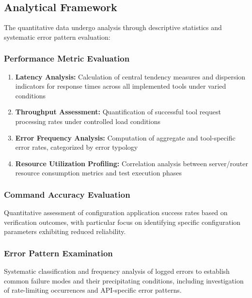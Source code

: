 \subsection{Analytical Framework}
The quantitative data undergo analysis through descriptive statistics and systematic error pattern evaluation:
\subsubsection{Performance Metric Evaluation}
\begin{enumerate}
\item \textbf{Latency Analysis:} Calculation of central tendency measures and dispersion indicators for response times across all implemented tools under varied conditions
\item \textbf{Throughput Assessment:} Quantification of successful tool request processing rates under controlled load conditions

\item \textbf{Error Frequency Analysis:} Computation of aggregate and tool-specific error rates, categorized by error typology

\item \textbf{Resource Utilization Profiling:} Correlation analysis between server/router resource consumption metrics and test execution phases
\end{enumerate}
\subsubsection{Command Accuracy Evaluation}
Quantitative assessment of configuration application success rates based on verification outcomes, with particular focus on identifying specific configuration parameters exhibiting reduced reliability.
\subsubsection{Error Pattern Examination}
Systematic classification and frequency analysis of logged errors to establish common failure modes and their precipitating conditions, including investigation of rate-limiting occurrences and API-specific error patterns.
